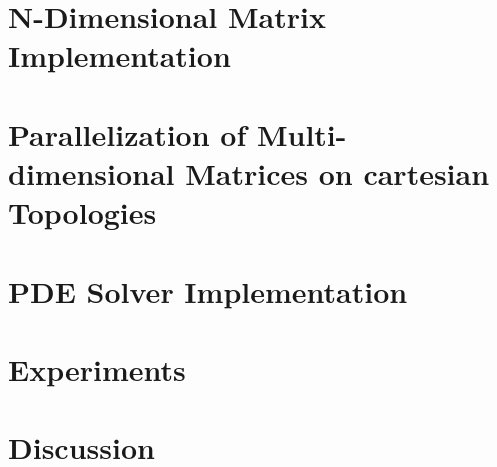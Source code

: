 \section{N-Dimensional Matrix Implementation}


\section{Parallelization of Multi-dimensional Matrices on cartesian Topologies}


\section{PDE Solver Implementation}


\section{Experiments}

\section{Discussion}



